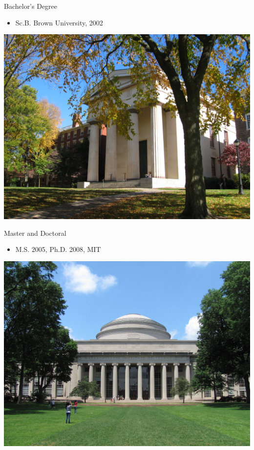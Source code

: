 \documentclass[10pt, svgnames]{beamer}
\begin{document}
\begin{frame}[label={sec:orgc8fc742}]{Bachelor's Degree}
\begin{itemize}
\item Sc.B. Brown University, 2002
\end{itemize}

\begin{center}
\includegraphics[width=.9\linewidth]{pictures/brown.jpg}
\end{center}
\end{frame}

\begin{frame}[label={sec:orgd5825cc}]{Master and Doctoral}
\begin{itemize}
\item M.S. 2005, Ph.D. 2008, MIT
\end{itemize}

\begin{center}
\includegraphics[width=.9\linewidth]{pictures/mit.jpg}
\end{center}
\end{frame}
\end{document}
